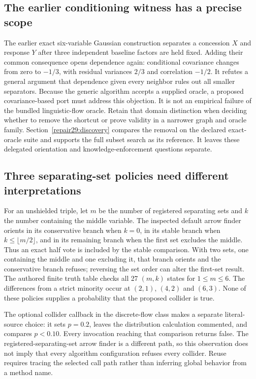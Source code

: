 \subsection{The earlier conditioning witness has a precise scope}
The earlier exact six-variable Gaussian construction separates a concession
$X$ and response $Y$ after three independent baseline factors are held fixed.
Adding their common consequence opens dependence again: conditional covariance
changes from zero to $-1/3$, with residual variances $2/3$ and correlation
$-1/2$. It refutes a general argument that dependence given every neighbor
rules out all smaller separators. Because the generic algorithm accepts a
supplied oracle, a proposed covariance-based port must address this objection.
It is not an empirical failure of the bundled linguistic-flow oracle. Retain
that domain distinction when deciding whether to remove the shortcut or prove
validity in a narrower graph and oracle family. Section~\ref{repair29:discovery}
compares the removal on the declared exact-oracle suite and supports the full
subset search as its reference. It leaves these delegated orientation and
knowledge-enforcement questions separate.
\citep{exec13_java_examples,exec13_java_aitiotita,exec28_fj_java}

\subsection{Three separating-set policies need different interpretations}
For an unshielded triple, let $m$ be the number of registered separating sets
and $k$ the number containing the middle variable. The inspected default
arrow finder orients in its conservative branch when $k=0$, in its stable
branch when $k\leq\lfloor m/2\rfloor$, and in its remaining branch when the
first set excludes the middle. Thus an exact half vote is included by the
stable comparison. With two sets, one containing the middle and one excluding
it, that branch orients and the conservative branch refuses; reversing the
set order can alter the first-set result. The authored finite truth table
checks all 27 $(m,k)$ states for $1\leq m\leq6$. The differences from a strict
minority occur at $(2,1)$, $(4,2)$ and $(6,3)$. None of these policies supplies
a probability that the proposed collider is true.~\citep{exec28_fj_java,exec28_fj_reference}

The optional collider callback in the discrete-flow class makes a separate
literal-source choice: it sets $p=0.2$, leaves the distribution calculation
commented, and compares $p<0.10$. Every invocation reaching that comparison
returns false. The registered-separating-set arrow finder is a different
path, so this observation does not imply that every algorithm configuration
refuses every collider. Reuse requires tracing the selected call path rather
than inferring global behavior from a method name.~\citep{exec28_fj_java}


